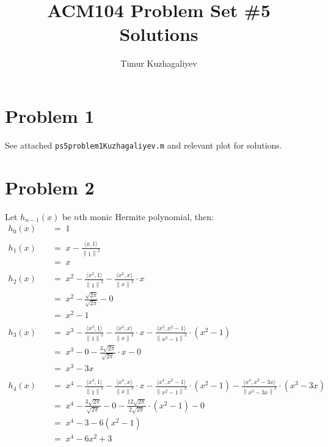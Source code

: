 \documentclass[10pt,letter]{article}
\newcommand{\inr}[2]{\langle #1, #2\rangle}
\newcommand\norm[1]{\left\lVert#1\right\rVert}
\begin{document}
\title{ACM104 Problem Set \#5 Solutions}

\author{Timur Kuzhagaliyev}

 
\maketitle 

\section*{Problem 1}
See attached \texttt{ps5problem1Kuzhagaliyev.m} and relevant plot for solutions.


\section*{Problem 2}
Let $h_{n-1}(x)$ be $n$th monic Hermite polynomial, then:
\begin{align*}
h_0(x) \quad &=\; 1
\\\\
h_1(x) \quad &=\; x - \frac{\inr{x}{1}}{\norm{1}^2}
\\ \quad &=\; x
\\\\
h_2(x) \quad &=\; x^2 - \frac{\inr{x^2}{1}}{\norm{1}^2} - \frac{\inr{x^2}{x}}{\norm{x}^2} \cdot x
\\ \quad &=\; x^2 - \frac{\sqrt{2 \pi}}{\sqrt{2 \pi}} - 0
\\ \quad &=\; x^2 - 1
\\\\
h_3(x) \quad &=\; x^3 - \frac{\inr{x^3}{1}}{\norm{1}^2} - \frac{\inr{x^3}{x}}{\norm{x}^2} \cdot x - \frac{\inr{x^3}{x^2 - 1}}{\norm{x^2 - 1}^2} \cdot (x^2 - 1)
\\ \quad &=\; x^3 - 0 - \frac{3 \sqrt{2 \pi}}{\sqrt{2 \pi}} \cdot x - 0
\\ \quad &=\; x^3 - 3 x
\\\\
h_4(x) \quad &=\; x^4 - \frac{\inr{x^4}{1}}{\norm{1}^2} - \frac{\inr{x^4}{x}}{\norm{x}^2} \cdot x - \frac{\inr{x^4}{x^2 - 1}}{\norm{x^2 - 1}^2} \cdot (x^2 - 1) - \frac{\inr{x^4}{x^3 - 3x}}{\norm{x^3 - 3 x}^2} \cdot (x^3 - 3x)
\\ \quad &=\; x^4 - \frac{3\sqrt{2\pi}}{\sqrt{2\pi}} - 0 - \frac{12 \sqrt{2\pi}}{2\sqrt{2\pi}} \cdot (x^2 - 1) - 0
\\ \quad &=\; x^4 - 3 - 6(x^2 - 1)
\\ \quad &=\; x^4 - 6x^2 + 3
\end{align*}
\end{document}
